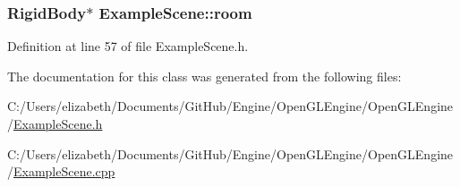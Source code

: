 \subsubsection[{\texorpdfstring{room}{room}}]{\setlength{\rightskip}{0pt plus 5cm}Rigid\+Body$\ast$ Example\+Scene\+::room\hspace{0.3cm}{\ttfamily [private]}}\hypertarget{class_example_scene_ae6292ce4efb3919a610deffea4c0c4f1}{}\label{class_example_scene_ae6292ce4efb3919a610deffea4c0c4f1}


Definition at line 57 of file Example\+Scene.\+h.



The documentation for this class was generated from the following files\+:\begin{DoxyCompactItemize}
\item 
C\+:/\+Users/elizabeth/\+Documents/\+Git\+Hub/\+Engine/\+Open\+G\+L\+Engine/\+Open\+G\+L\+Engine/\hyperlink{_example_scene_8h}{Example\+Scene.\+h}\item 
C\+:/\+Users/elizabeth/\+Documents/\+Git\+Hub/\+Engine/\+Open\+G\+L\+Engine/\+Open\+G\+L\+Engine/\hyperlink{_example_scene_8cpp}{Example\+Scene.\+cpp}\end{DoxyCompactItemize}
